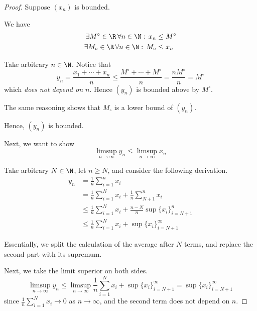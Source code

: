 \documentclass[11pt,letterpaper]{article}
\begin{document}
\begin{proof}
  Suppose $(x_n)$ is bounded.

  We have
  \begin{align}
    \exists M^\circ \in \R\, \forall n \in \N:\, x_n &\leq M^\circ
    \label{eq:xn-bounded-above} \\
    \exists M_\circ \in \R\, \forall n \in \N:\, M_\circ &\leq x_n
    \label{eq:xn-bounded-below}
  \end{align}

  Take arbitrary $n \in \N$. Notice that
  \begin{equation*}
    y_n
    = \frac{x_1 + \cdots + x_n}{n}
    \leq \frac{M^\circ + \cdots + M^\circ}{n}
    = \frac{n M^\circ}{n}
    = M^\circ
  \end{equation*}
  which \emph{does not depend on $n$}. Hence $(y_n)$ is bounded above by
  $M^\circ$.

  The same reasoning shows that $M_\circ$ is a lower bound of $(y_n)$.

  Hence, $(y_n)$ is bounded.

  Next, we want to show
  \begin{equation}
    \limsup_{n\to\infty}{y_n}
    \leq
    \limsup_{n\to\infty}{x_n}
  \end{equation}

  Take arbitrary $N \in \N$, let $n \geq N$, and consider the following
  derivation.
  \begin{align*}
    y_n
    &= \frac{1}{n} \sum_{i=1}^n {x_i} \\
    &= \frac{1}{n} \sum_{i=1}^N {x_i}
      + \frac{1}{n} \sum_{N+1}^n {x_i} \\
    &\leq \frac{1}{n} \sum_{i=1}^N {x_i}
      + \frac{n-N}{n} \sup \{x_i\}_{i=N+1}^n \\
    &\leq \frac{1}{n} \sum_{i=1}^N {x_i}
      + \sup \{x_i\}_{i=N+1}^\infty
  \end{align*}

  Essentially, we split the calculation of the average after $N$ terms, and
  replace the second part with its supremum.

  Next, we take the limit superior on both sides.
  \begin{equation*}
    \limsup_{n\to\infty} {y_n}
    \leq \limsup_{n\to\infty} {
      \frac{1}{n} \sum_{i=1}^N {x_i} + \sup \{x_i\}_{i=N+1}^\infty
    }
    = \sup \{x_i\}_{i=N+1}^\infty
  \end{equation*}
  since $\frac{1}{n} \sum_{i=1}^N {x_i} \to 0$ as $n \to \infty$, and the
  second term does not depend on $n$.


\end{proof}
\end{document}
